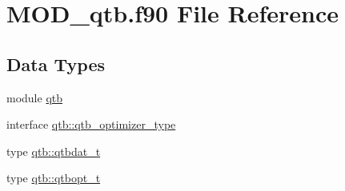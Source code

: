 \hypertarget{MOD__qtb_8f90}{\section{M\-O\-D\-\_\-qtb.\-f90 File Reference}
\label{MOD__qtb_8f90}
}
\subsection*{Data Types}
\begin{DoxyCompactItemize}
\item 
module \hyperlink{classqtb}{qtb}
\item 
interface \hyperlink{interfaceqtb_1_1qtb__optimizer__type}{qtb\-::qtb\-\_\-optimizer\-\_\-type}
\item 
type \hyperlink{structqtb_1_1qtbdat__t}{qtb\-::qtbdat\-\_\-t}
\item 
type \hyperlink{structqtb_1_1qtbopt__t}{qtb\-::qtbopt\-\_\-t}
\end{DoxyCompactItemize}
